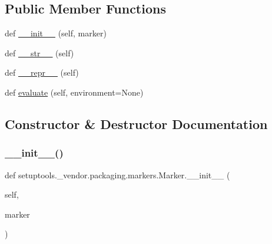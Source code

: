 \subsection*{Public Member Functions}
\begin{DoxyCompactItemize}
\item 
def \hyperlink{classsetuptools_1_1__vendor_1_1packaging_1_1markers_1_1Marker_a4f2c2b7b2ace011874a56ab0f5c0e24f}{\+\_\+\+\_\+init\+\_\+\+\_\+} (self, marker)
\item 
def \hyperlink{classsetuptools_1_1__vendor_1_1packaging_1_1markers_1_1Marker_abed4ab5be8dabced95a93e8392f68fe7}{\+\_\+\+\_\+str\+\_\+\+\_\+} (self)
\item 
def \hyperlink{classsetuptools_1_1__vendor_1_1packaging_1_1markers_1_1Marker_a4f8d3d5d8bc458e2d00f07c68a269793}{\+\_\+\+\_\+repr\+\_\+\+\_\+} (self)
\item 
def \hyperlink{classsetuptools_1_1__vendor_1_1packaging_1_1markers_1_1Marker_a8d1f4d461e68c50f083b6753e0329491}{evaluate} (self, environment=None)
\end{DoxyCompactItemize}


\subsection{Constructor \& Destructor Documentation}
\mbox{\label{classsetuptools_1_1__vendor_1_1packaging_1_1markers_1_1Marker_a4f2c2b7b2ace011874a56ab0f5c0e24f}} 
\subsubsection{\texorpdfstring{\+\_\+\+\_\+init\+\_\+\+\_\+()}{\_\_init\_\_()}}
{\footnotesize\ttfamily def setuptools.\+\_\+vendor.\+packaging.\+markers.\+Marker.\+\_\+\+\_\+init\+\_\+\+\_\+ (\begin{DoxyParamCaption}\item[{}]{self,  }\item[{}]{marker }\end{DoxyParamCaption})}



